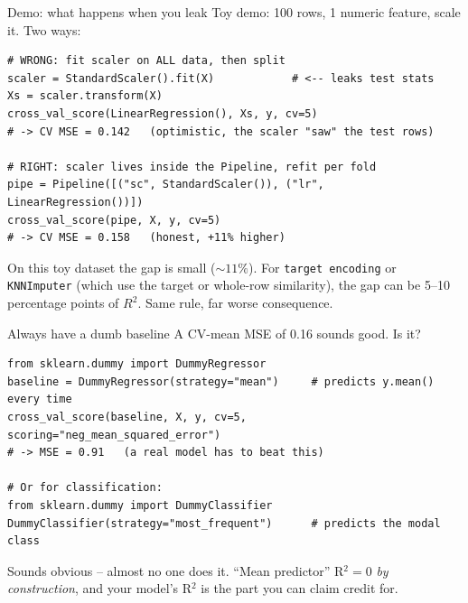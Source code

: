 \documentclass[aspectratio=169]{beamer}
\begin{document}
\begin{frame}[fragile]{Demo: what happens when you leak}
  Toy demo: 100 rows, 1 numeric feature, scale it. Two ways:
{\lstset{basicstyle=\ttfamily\scriptsize}
\begin{lstlisting}
# WRONG: fit scaler on ALL data, then split
scaler = StandardScaler().fit(X)            # <-- leaks test stats
Xs = scaler.transform(X)
cross_val_score(LinearRegression(), Xs, y, cv=5)
# -> CV MSE = 0.142   (optimistic, the scaler "saw" the test rows)

# RIGHT: scaler lives inside the Pipeline, refit per fold
pipe = Pipeline([("sc", StandardScaler()), ("lr", LinearRegression())])
cross_val_score(pipe, X, y, cv=5)
# -> CV MSE = 0.158   (honest, +11% higher)
\end{lstlisting}}
  \vfill
  \footnotesize On this toy dataset the gap is small ($\sim 11\%$). For \texttt{target encoding} or \texttt{KNNImputer} (which use the target or whole-row similarity), the gap can be 5--10 percentage points of $R^2$. Same rule, far worse consequence.
  \vfill
\end{frame}

\begin{frame}[fragile]{Always have a dumb baseline}
  A CV-mean MSE of 0.16 sounds good. Is it?
{\lstset{basicstyle=\ttfamily\scriptsize}
\begin{lstlisting}
from sklearn.dummy import DummyRegressor
baseline = DummyRegressor(strategy="mean")     # predicts y.mean() every time
cross_val_score(baseline, X, y, cv=5, scoring="neg_mean_squared_error")
# -> MSE = 0.91   (a real model has to beat this)

# Or for classification:
from sklearn.dummy import DummyClassifier
DummyClassifier(strategy="most_frequent")      # predicts the modal class
\end{lstlisting}}
  \vfill
  \footnotesize Sounds obvious -- almost no one does it. ``Mean predictor'' R$^2 = 0$ \emph{by construction}, and your model's R$^2$ is the part you can claim credit for.
  \vfill
\end{frame}
\end{document}
